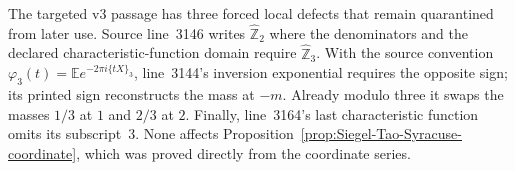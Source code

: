 \begin{sourceissue}
\label{sourceissue:Siegel-2007-v3-Fourier}
The targeted v3 passage has three forced local defects that remain quarantined
from later use.  Source line~3146 writes \(\widehat{\mathbb Z}_2\) where the
denominators and the declared characteristic-function domain require
\(\widehat{\mathbb Z}_3\).  With the source convention
\(\varphi_3(t)=\mathbb E e^{-2\pi i\{tX\}_3}\), line~3144's inversion
exponential requires the opposite sign; its printed sign reconstructs the
mass at \(-m\).  Already modulo three it swaps the masses $1/3$ at $1$ and
$2/3$ at $2$.  Finally, line~3164's last characteristic function omits its
subscript~$3$.  None affects Proposition~\ref{prop:Siegel-Tao-Syracuse-coordinate},
which was proved directly from the coordinate series.
\end{sourceissue}


